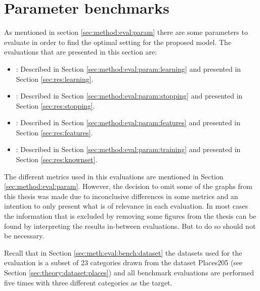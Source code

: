 \section{Parameter benchmarks}
\label{sec:res:param}

As mentioned in section \ref{sec:method:eval:param} there are some parameters to evaluate in order to find the optimal setting for the proposed model. The evaluations that are presented in this section are:
\begin{itemize}
\item \textbf{}: Described in Section \ref{sec:method:eval:param:learning} and presented in Section \ref{sec:res:learning}.
\item \textbf{}: Described in Section \ref{sec:method:eval:param:stopping} and presented in Section \ref{sec:res:stopping}.
\item \textbf{ }: Described in Section \ref{sec:method:eval:param:features} and presented in Section \ref{sec:res:features}.
\item \textbf{}: Described in Section \ref{sec:method:eval:param:training} and presented in Section \ref{sec:res:knownset}.
\end{itemize}
\medskip
The different metrics used in this evaluations are mentioned in Section \ref{sec:method:eval:param}. 
However, the decision to omit some of the graphs from this thesis was made due to inconclusive differences in some metrics and an intention to only present what is of relevance in each evaluation. In most cases the information that is excluded by removing some figures from the thesis can be found by interpreting the results in-between evaluations. But to do so should not be necessary.

Recall that in Section \ref{sec:meth:eval:bench:dataset} the datasets used for the evaluation is a subset of 23 categories drawn from the dataset Places205 (see Section \ref{sec:theory:dataset:places}) and all benchmark evaluations are performed five times with three different categories as the target.





